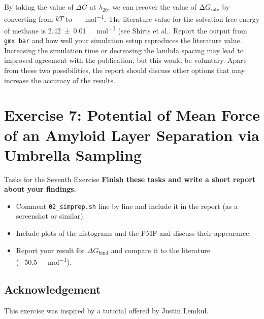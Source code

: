 \documentclass[9pt,tutorial]{livecoms}
\newcommand{\code}[1]{\colorbox{light-gray}{\texttt{#1}}}
\begin{document}
By taking the value of $\Delta G$ at $\lambda_{20}$, we can recover the value of $\Delta G_\text{\tiny solv}$ by converting from $kT$ to \SI{}{\kilo\calorie\per\mole}. The literature value for the solvation free energy of methane is \SI[separate-uncertainty]{2.42(1)}{\kilo\calorie\per\mole} (see Shirts et al.\cite{Shirts_2003}. Report the output from \code{gmx bar} and how well your simulation setup reproduces the literature value. Increasing the simulation time or decreasing the lambda spacing may lead to improved agreement with the publication, but this would be voluntary. Apart from these two possibilities, the report should discuss other options that may increase the accuracy of the results.

\newpage

\section{Exercise 7: Potential of Mean Force of an Amyloid Layer Separation via Umbrella Sampling}\label{sec:freeEnerBind}
\begin{Checklists}
    \begin{checklist}{Tasks for the Seventh Exercise}
    \textbf{Finish these tasks and write a short report about your findings.}
    \begin{itemize}
		\item Comment \code{02\_simprep.sh} line by line and include it in the report (as a screenshot or similar).
		\item Include plots of the histograms and the PMF and discuss their appearance.
		\item Report your result for $\Delta G_\text{bind}$ and compare it to the literature (\SI{-50.5}{\kilo\calorie\per\mole}).
	\end{itemize} 
    \end{checklist}
\end{Checklists}


\subsection*{Acknowledgement}
This exercise was inspired by a tutorial offered by Justin Lemkul\cite{Lemkul2019}.
\end{document}
